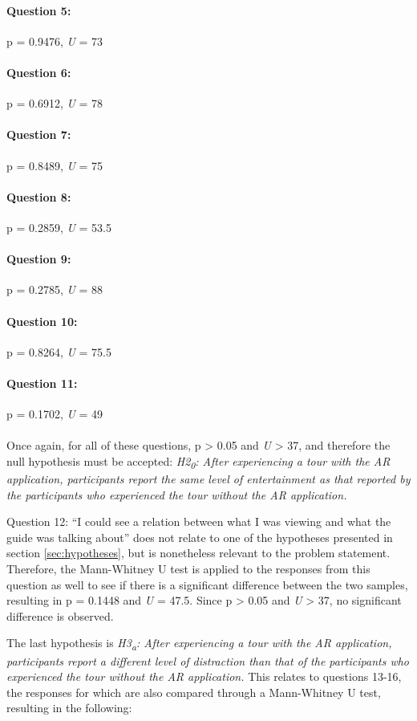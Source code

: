 \paragraph{Question 5:} p = 0.9476, \textit{U} = 73
\paragraph{Question 6:} p = 0.6912, \textit{U} = 78
\paragraph{Question 7:} p = 0.8489, \textit{U} = 75
\paragraph{Question 8:} p = 0.2859, \textit{U} = 53.5
\paragraph{Question 9:} p = 0.2785, \textit{U} = 88
\paragraph{Question 10:} p = 0.8264, \textit{U} = 75.5
\paragraph{Question 11:} p = 0.1702, \textit{U} = 49\\
\\
Once again, for all of these questions, p > 0.05 and \textit{U} > 37, and therefore the null hypothesis must be accepted: \textit{H2\textsubscript{0}: After experiencing a tour with the AR application, participants report the same level of entertainment as that reported by the participants who experienced the tour without the AR application.}

Question 12: “I could see a relation between what I was viewing and what the guide was talking about” does not relate to one of the hypotheses presented in section \ref{sec:hypotheses}, but is nonetheless relevant to the problem statement. Therefore, the Mann-Whitney U test is applied to the responses from this question as well to see if there is a significant difference between the two samples, resulting in p = 0.1448 and \textit{U} = 47.5. Since p > 0.05 and \textit{U} > 37, no significant difference is observed. 

The last hypothesis is \textit{H3\textsubscript{a}: After experiencing a tour with the AR application, participants report a different level of distraction than that of the participants who experienced the tour without the AR application.} This relates to questions 13-16, the responses for which are also compared through a Mann-Whitney U test, resulting in the following:


